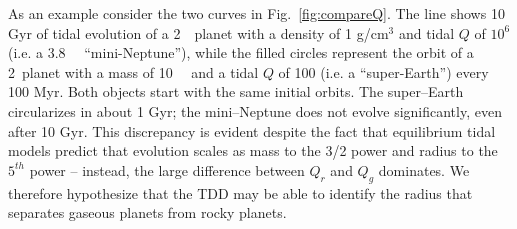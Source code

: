 As an example consider the two curves in Fig.~\ref{fig:compareQ}.  The
line shows 10 Gyr of tidal evolution of a 2~\rearth~planet with a
density of 1 g/cm$^3$ and tidal $Q$ of $10^6$ (i.e. a 3.8~\mearth~
``mini-Neptune''), while the filled circles represent the orbit of a
2~\rearth planet with a mass of 10~\mearth~ and a tidal $Q$ of 100
(i.e. a ``super-Earth'') every 100 Myr.  Both objects start with the
same initial orbits.  The super--Earth circularizes in about 1 Gyr;
the mini--Neptune does not evolve significantly, even after 10 Gyr.
This discrepancy is evident despite the fact that equilibrium tidal
models predict that evolution scales as mass to the 3/2 power and
radius to the $5^{th}$ power -- instead, the large difference between
$Q_r$ and $Q_g$ dominates.  We therefore hypothesize that the TDD may
be able to identify the radius that separates gaseous planets from
rocky planets.

